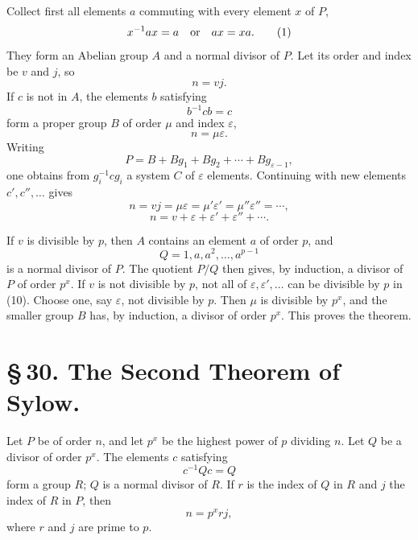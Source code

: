 \documentclass[11pt]{article}
\begin{document}
Collect first all elements $a$ commuting with every element $x$ of $P$,
\begin{equation}
x^{-1}ax=a \quad\hbox{or}\quad ax=xa.
\tag{1}
\end{equation}
They form an Abelian group $A$ and a normal divisor of $P$. Let its order and index be $v$ and $j$, so
\begin{equation}
n=vj.
\tag{2}
\end{equation}
If $c$ is not in $A$, the elements $b$ satisfying
\begin{equation}
b^{-1}cb=c
\tag{3}
\end{equation}
form a proper group $B$ of order $\mu$ and index $\varepsilon$,
\begin{equation}
n=\mu\varepsilon.
\tag{4}
\end{equation}
Writing
\begin{equation}
P=B+Bg_1+Bg_2+\cdots+Bg_{\varepsilon-1},
\tag{6}
\end{equation}
one obtains from $g_i^{-1}cg_i$ a system $C$ of $\varepsilon$ elements. Continuing with new elements $c',c'',\ldots$ gives
\begin{equation}
n=vj=\mu\varepsilon=\mu'\varepsilon'=\mu''\varepsilon''=\cdots,
\tag{9}
\end{equation}
\begin{equation}
n=v+\varepsilon+\varepsilon'+\varepsilon''+\cdots .
\tag{10}
\end{equation}

If $v$ is divisible by $p$, then $A$ contains an element $a$ of order $p$, and
\[
Q=1,a,a^2,\ldots,a^{p-1}
\]
is a normal divisor of $P$. The quotient $P/Q$ then gives, by induction, a divisor of $P$ of order $p^x$. If $v$ is not divisible by $p$, not all of $\varepsilon,\varepsilon',\ldots$ can be divisible by $p$ in (10). Choose one, say $\varepsilon$, not divisible by $p$. Then $\mu$ is divisible by $p^x$, and the smaller group $B$ has, by induction, a divisor of order $p^x$. This proves the theorem.

\section*{\S\,30. The Second Theorem of Sylow.}

Let $P$ be of order $n$, and let $p^x$ be the highest power of $p$ dividing $n$. Let $Q$ be a divisor of order $p^x$. The elements $c$ satisfying
\begin{equation}
c^{-1}Qc=Q
\tag{1}
\end{equation}
form a group $R$; $Q$ is a normal divisor of $R$. If $r$ is the index of $Q$ in $R$ and $j$ the index of $R$ in $P$, then
\begin{equation}
n=p^x rj,
\tag{2}
\end{equation}
where $r$ and $j$ are prime to $p$.
\end{document}
